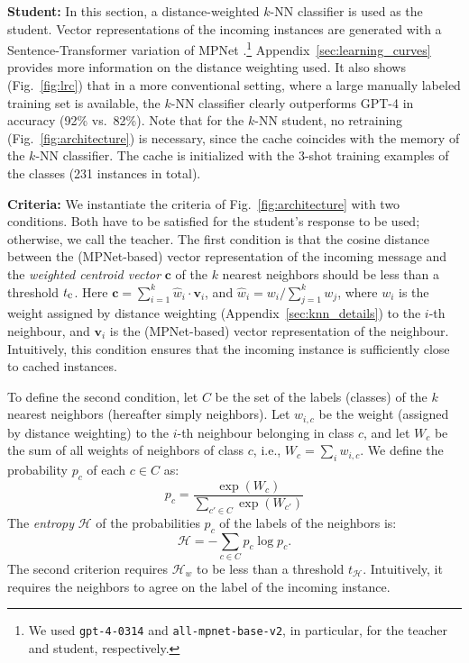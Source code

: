 \documentclass[11pt]{article}
\begin{document}
\vspace{1mm}\noindent\textbf{Student:} 
In this section, a distance-weighted $k$-NN classifier is used as the student. Vector representations of the incoming instances are generated with a Sentence-Transformer \cite{reimers-gurevych-2019-sentence} variation of MPNet \cite{song2020mpnet}.\footnote{We used \texttt{gpt-4-0314} and \texttt{all-mpnet-base-v2}, in particular, for the teacher and student, respectively.} Appendix~\ref{sec:learning_curves} provides more information on the distance weighting used. It also shows (Fig.~\ref{fig:lrc}) that in a more conventional setting, where a large manually labeled training set is available, the $k$-NN classifier clearly outperforms GPT-4 in accuracy (92\% vs.\ 82\%). Note that for the $k$-NN student, no retraining (Fig.~\ref{fig:architecture}) is necessary, since the cache coincides with the memory of the $k$-NN classifier. The cache is initialized with the 3-shot training examples of the classes (231 instances in total). 

\vspace{1mm}\noindent\textbf{Criteria:} We instantiate the criteria of Fig.~\ref{fig:architecture} with two conditions. Both have to be satisfied for the student's response to be used; otherwise, we call the teacher. The first condition is that the cosine distance between the (MPNet-based) vector representation of the incoming message and the \emph{weighted centroid vector} $\mathbf{c}$ of the $k$ nearest neighbors should be less than a threshold $t_{\textrm{\small c}}$. Here
$\mathbf{c} = \sum_{i=1}^{k}\hat{w}_i \cdot \mathbf{v}_i$, 
and $\hat{w}_i = w_i/\sum_{j=1}^{k} w_j$, where $w_i$ is the weight assigned by distance weighting (Appendix~\ref{sec:knn_details}) to the $i$-th neighbour, and $\mathbf{v}_i$ is the (MPNet-based) vector representation of the neighbour. Intuitively, this condition ensures that the incoming instance is sufficiently close to cached instances.

To define the second condition, let $C$ be the set of the labels (classes) of the $k$ nearest neighbors (hereafter simply neighbors). Let $w_{i,c}$ be the weight (assigned by distance weighting) to the $i$-th neighbour belonging in class $c$, and let $W_c$ be the sum of all weights of neighbors of class $c$, i.e., $W_c = \sum_i{w_{i,c}}$. We define the probability $p_c$ of each $c \in C$ as:
\[p_c = \frac{\exp(W_c)}{\sum_{c' \in C} \exp(W_{c'})}\] The \emph{entropy} $\mathcal{H}$ of the probabilities $p_c$ of the labels of the neighbors is:
\[\mathcal{H} = -\sum_{c \in C} p_c \log{p_c}.
\]
The second criterion requires $\mathcal{H}_w$ to be less than a threshold $t_\mathcal{H}$. Intuitively, it requires the neighbors to agree on the label of the incoming instance.
\end{document}

